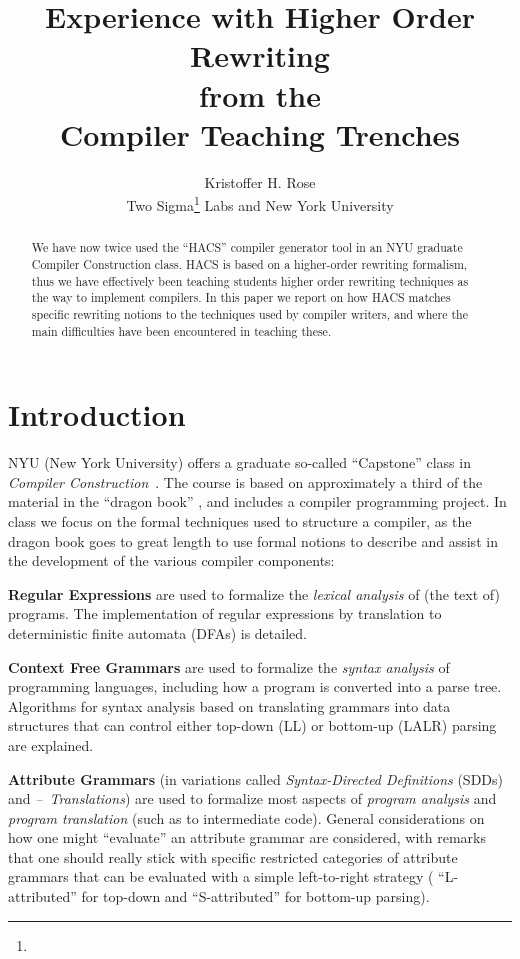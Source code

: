 \documentclass{article}
\title{Experience with Higher Order Rewriting \\ from the \\ Compiler Teaching Trenches}
\author{Kristoffer H. Rose\\
  Two Sigma\thanks{} Labs
  and New York University
}
\begin{document}
\small
\maketitle

\begin{abstract}\noindent
  We have now twice used the ``HACS'' compiler generator tool in an NYU graduate Compiler
  Construction class. HACS is based on a higher-order rewriting formalism, thus we have effectively
  been teaching students higher order rewriting techniques as the way to implement compilers. In
  this paper we report on how HACS matches specific rewriting notions to the techniques used by
  compiler writers, and where the main difficulties have been encountered in teaching these.
\end{abstract}



\section{Introduction}

NYU (New York University) offers a graduate so-called ``Capstone'' class in \emph{Compiler
  Construction}~\cite{Rose:nyu2014}. The course is based on approximately a third of the material in
the ``dragon book'' \cite{Aho+:2006}, and includes a compiler programming project.  In class we
focus on the formal techniques used to structure a compiler, as the dragon book goes to great length
to use formal notions to describe and assist in the development of the various compiler components:

\smallskip\noindent\textbf{Regular Expressions} are used to formalize the \emph{lexical analysis} of (the text of)
  programs. The implementation of regular expressions by translation to deterministic finite
  automata (DFAs) is detailed.

\smallskip\noindent\textbf{Context Free Grammars} are used to formalize the \emph{syntax analysis} of programming
  languages, including how a program is converted into a parse tree.  Algorithms for syntax analysis
  based on translating grammars into data structures that can control either top-down (LL) or
  bottom-up (LALR) parsing are explained.

\smallskip\noindent\textbf{Attribute Grammars} (in variations called \emph{Syntax-Directed Definitions} (SDDs) and
  \emph{--~Translations}) are used to formalize most aspects of \emph{program analysis} and
  \emph{program translation} (such as to intermediate code).  General considerations on how one
  might ``evaluate'' an attribute grammar are considered, with remarks that one should really stick
  with specific restricted categories of attribute grammars that can be evaluated with a simple
  left-to-right strategy ( ``L-attributed'' for top-down and ``S-attributed'' for bottom-up
  parsing).
\end{document}
